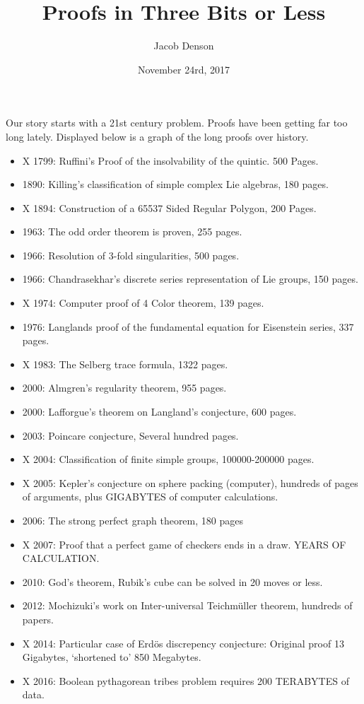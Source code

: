 \documentclass{article}
\title{Proofs in Three Bits or Less}
\author{Jacob Denson}
\date{November 24rd, 2017}
\theoremstyle{plain}
\theoremstyle{definition}
\begin{document}
\maketitle

Our story starts with a 21st century problem. Proofs have been getting far too long lately. Displayed below is a graph of the long proofs over history.
%
\begin{itemize}
    \item X 1799: Ruffini's Proof of the insolvability of the quintic. 500 Pages.
    \item 1890: Killing's classification of simple complex Lie algebras, 180 pages.
    \item X 1894: Construction of a 65537 Sided Regular Polygon, 200 Pages.
    \item 1963: The odd order theorem is proven, 255 pages.
    \item 1966: Resolution of 3-fold singularities, 500 pages.
    \item 1966: Chandrasekhar's discrete series representation of Lie groups, 150 pages.
    \item X 1974: Computer proof of 4 Color theorem, 139 pages.
    \item 1976: Langlands proof of the fundamental equation for Eisenstein series, 337 pages.
    \item X 1983: The Selberg trace formula, 1322 pages.
    \item 2000: Almgren's regularity theorem, 955 pages.
    \item 2000: Lafforgue's theorem on Langland's conjecture, 600 pages.
    \item 2003: Poincare conjecture, Several hundred pages.
    \item X 2004: Classification of finite simple groups, 100000-200000 pages.
    \item X 2005: Kepler's conjecture on sphere packing (computer), hundreds of pages of arguments, plus GIGABYTES of computer calculations.
    \item 2006: The strong perfect graph theorem, 180 pages
    \item X 2007: Proof that a perfect game of checkers ends in a draw. YEARS OF CALCULATION.
    \item 2010: God's theorem, Rubik's cube can be solved in 20 moves or less.
    \item 2012: Mochizuki's work on Inter-universal Teichm\"{u}ller theorem, hundreds of papers.
    \item X 2014: Particular case of Erd\"{o}s discrepency conjecture: Original proof 13 Gigabytes, `shortened to' 850 Megabytes.
    \item X 2016: Boolean pythagorean tribes problem requires 200 TERABYTES of data.
\end{itemize}
\end{document}
